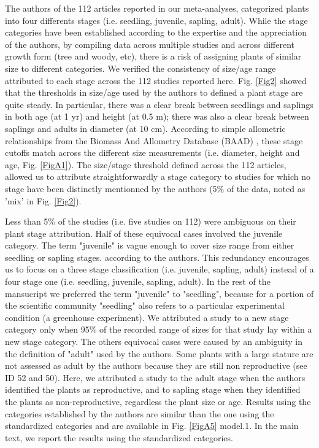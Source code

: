 \documentclass[a4paper]{article}\usepackage[]{graphicx}\usepackage[]{color}
\begin{document}
The authors of the 112 articles reported in our meta-analyses, categorized plants into four differents stages (i.e. seedling, juvenile, sapling, adult). While the stage categories have been established according to the expertise and the appreciation of the authors, by compiling data across multiple studies and across different growth form (tree and woody, etc), there is a risk of assigning plants of similar size to different categories. We verified the consistency of size/age range attributed to each stage across the 112 studies reported here. Fig. \ref{Fig2} showed that the thresholds in size/age used by the authors to defined a plant stage are quite steady. In particular, there was a clear break between seedlings and saplings in both age (at 1 yr) and height (at 0.5 m); there was also a clear break between saplings and adults in diameter (at 10 cm). According to simple allometric relationships from the Biomass And Allometry Database (BAAD) \citep{Falster:2015}, these stage cutoffs match across the different size measurements (i.e. diameter, height and age, Fig. \ref{FigA1}). The size/stage threshold defined across the 112 articles, allowed us to attribute straightforwardly a stage category to studies for which no stage have been distinctly mentionned by the authors (5\% of the data, noted as 'mix' in Fig. \ref{Fig2}).

Less than 5\% of the studies (i.e. five studies on 112) were ambiguous on their plant stage attribution. Half of these equivocal cases involved the juvenile category. The term "juvenile" is vague enough to cover size range from either seedling or sapling stages. according to the authors. This redundancy encourages us to focus on a three stage classification (i.e. juvenile, sapling, adult) instead of a four stage one (i.e. seedling, juvenile, sapling, adult). In the rest of the mansucript we preferred the term "juvenile" to "seedling", because for a portion of the scientific community "seedling" also refers to a particular experimental condition (a greenhouse experiment). We attributed a study to a new stage category only when 95\% of the recorded range of sizes for that study lay within a new stage category. The others equivocal cases were caused by an ambiguity in the definition of "adult" used by the authors. Some plants with a large stature are not assessed as adult by the authors because they are still non reproductive (see ID 52 and 50). Here, we attributed a study to the adult stage when the authors identified the plants as reproductive, and to sapling stage when they identified the plants as non-reproductive, regardless the plant size or age. Results using the categories established by the authors are similar than the one using the standardized categories and are available in Fig. \ref{FigA5} model.1. In the main text, we report the results using the standardized categories. 
\end{document}
